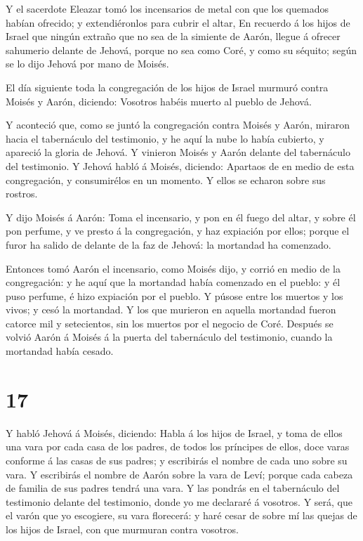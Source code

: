  Y el sacerdote Eleazar tomó los incensarios de metal con
que los quemados habían ofrecido; y extendiéronlos para cubrir el altar,
 En recuerdo á los hijos de Israel que ningún extraño que
no sea de la simiente de Aarón, llegue á ofrecer sahumerio delante de
Jehová, porque no sea como Coré, y como su séquito; según se lo dijo
Jehová por mano de Moisés.

 El día siguiente toda la congregación de los hijos de
Israel murmuró contra Moisés y Aarón, diciendo: Vosotros habéis muerto
al pueblo de Jehová.

 Y aconteció que, como se juntó la congregación contra
Moisés y Aarón, miraron hacia el tabernáculo del testimonio, y he aquí
la nube lo había cubierto, y apareció la gloria de Jehová. 
Y vinieron Moisés y Aarón delante del tabernáculo del testimonio.
 Y Jehová habló á Moisés, diciendo:  Apartaos
de en medio de esta congregación, y consumirélos en un momento. Y ellos
se echaron sobre sus rostros.

 Y dijo Moisés á Aarón: Toma el incensario, y pon en él
fuego del altar, y sobre él pon perfume, y ve presto á la congregación,
y haz expiación por ellos; porque el furor ha salido de delante de la
faz de Jehová: la mortandad ha comenzado.

 Entonces tomó Aarón el incensario, como Moisés dijo, y
corrió en medio de la congregación: y he aquí que la mortandad había
comenzado en el pueblo: y él puso perfume, é hizo expiación por el
pueblo.  Y púsose entre los muertos y los vivos; y cesó la
mortandad.  Y los que murieron en aquella mortandad fueron
catorce mil y setecientos, sin los muertos por el negocio de Coré.
 Después se volvió Aarón á Moisés á la puerta del
tabernáculo del testimonio, cuando la mortandad había cesado.

\hypertarget{section-16}{%
\section{17}\label{section-16}}

 Y habló Jehová á Moisés, diciendo:  Habla á los
hijos de Israel, y toma de ellos una vara por cada casa de los padres,
de todos los príncipes de ellos, doce varas conforme á las casas de sus
padres; y escribirás el nombre de cada uno sobre su vara.  Y
escribirás el nombre de Aarón sobre la vara de Leví; porque cada cabeza
de familia de sus padres tendrá una vara.  Y las pondrás en
el tabernáculo del testimonio delante del testimonio, donde yo me
declararé á vosotros.  Y será, que el varón que yo
escogiere, su vara florecerá: y haré cesar de sobre mí las quejas de los
hijos de Israel, con que murmuran contra vosotros.

